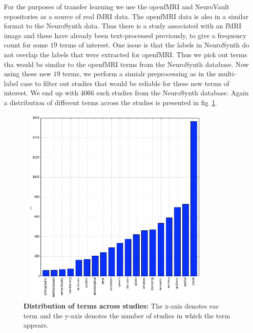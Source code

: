 \documentclass{article} %
\begin{document}
For the purposes of transfer learning we use the openfMRI and NeuroVault repositories as a source of real fMRI data. The openfMRI data is also in a similar format to the NeuroSynth data.  Thus there is a study associated with an fMRI image and these have already been text-processed previously, to give a frequency count for some $19$ terms of interest.  One issue is that the labels in NeuroSynth do not overlap the labels that were extracted for openfMRI. Thus we pick out terms tha would be similar to the openfMRI terms from the NeuroSynth database. Now using these new $19$ terms, we perform a simialr preprocessing as in the multi-label case to filter out studies that would be reliable for these new terms of interest. We end up with $4066$ such studies from the NeuroSynth database. Again a distribution of different terms across the studies is presented in fig~\ref{fig:histo_new}.

\begin{figure}[h]
\begin{center}
\includegraphics[height=10cm, width=10cm]{histo_new.png}
\end{center}
\caption{\textbf{Distribution of terms across studies:} The x-axis denotes eac term and the y-axis denotes the number of studies in which the term appears.}
\label{fig:histo_new}
\end{figure}
\end{document}

